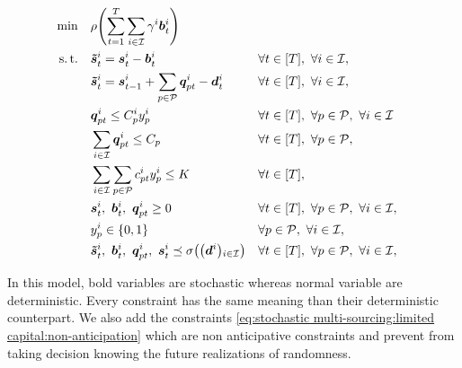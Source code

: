 \begin{subequations}\label{eq:stochastic multi-sourcing:limited capital}
  \begin{align}
    \min\quad & \rlap{$\ds \rho\bracket{\sum_{t=1}^{\horizon} \sum_{i\in\REF} \backorder^i \va\backlog_t^i}$}
    \label{eq:stochastic multi-sourcing:limited capital:objective}
    \\
    \st\quad & \ds \va\level_t^i = \va\inventory_t^i - \va\backlog_t^i && \forall t\in\range{\horizon},\ \forall i\in\REF,
    \label{eq:stochastic multi-sourcing:limited capital:inventory}
    \\
    & \ds \va\level_t^i = \va\inventory_{t-1}^i + \sum_{p\in\plants}\va\quantity_{pt}^i - \va\demand_t^i && \forall t\in\range{\horizon},\ \forall i\in\REF,
    \label{eq:stochastic multi-sourcing:limited capital:dynamic}
    \\
    & \ds \va\quantity_{pt}^i \le \capacity_p^i \open_p^i && \forall t\in\range{\horizon},\ \forall p\in\plants,\ \forall i\in\REF
    \label{eq:stochastic multi-sourcing:limited capital:big M}
    \\
    & \ds \sum_{i\in\REF}\va\quantity_{pt}^i \le \capacity_p && \forall t\in\range{\horizon},\ \forall p\in\plants,
    \label{eq:stochastic multi-sourcing:limited capital:capacity}
    \\
    & \ds \sum_{i\in\REF} \sum_{p\in\plants}\affect_{pt}^i\open_p^i \le \capital && \forall t\in\range{\horizon},
    \label{eq:stochastic multi-sourcing:limited capital:capital}
    \\
    & \ds \va\inventory_t^i,\ \va\backlog_t^i,\ \va\quantity_{pt}^i \ge 0 && \forall t\in\range{\horizon},\ \forall p\in\plants,\ \forall i\in\REF,
    \label{eq:stochastic multi-sourcing:limited capital:nonnegativity}
    \\
    & \ds \open_p^i \in \crbracket{0,1} && \forall p\in\plants,\ \forall i\in\REF,
    \label{eq:stochastic multi-sourcing:limited capital:binary}
    \\
    & \ds \va\level_t^i,\ \va\backlog_t^i,\ \va\quantity_{pt}^i,\ \va\inventory_t^i \preceq \Sfield{\bracket{\va\demand^i}_{i\in\REF}} && \forall t\in\range{\horizon},\ \forall p\in\plants,\ \forall i\in\REF,
    \label{eq:stochastic multi-sourcing:limited capital:non-anticipation}
  \end{align}
\end{subequations}

In this model, bold variables are stochastic whereas normal variable are deterministic. Every constraint has the same meaning than their deterministic counterpart. We also add the constraints \eqref{eq:stochastic multi-sourcing:limited capital:non-anticipation} which are non anticipative constraints and prevent from taking decision knowing the future realizations of randomness.


